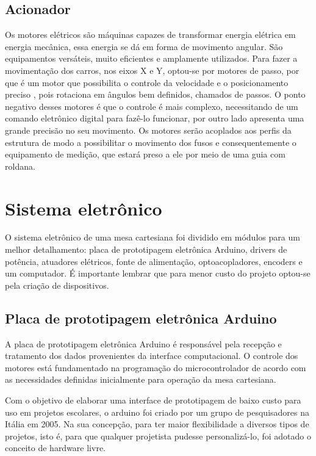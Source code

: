\subsection{Acionador}

Os motores elétricos são máquinas capazes de transformar energia elétrica em energia mecânica, 
essa energia se dá em forma de movimento angular. São equipamentos versáteis, muito eficientes 
e amplamente utilizados. Para fazer a movimentação dos carros, nos eixos X e Y, optou-se por 
motores de passo, por que é um motor que possibilita o controle da velocidade e o posicionamento 
preciso , pois rotaciona em ângulos bem definidos, chamados de passos. O ponto negativo desses 
motores é que o controle é mais complexo, necessitando de um comando eletrônico digital para 
fazê-lo funcionar, por outro lado apresenta uma grande precisão no seu movimento. Os motores 
serão acoplados aos perfis da estrutura de modo a possibilitar o movimento dos fusos e consequentemente 
o equipamento de medição, que estará preso a ele por meio de uma guia com roldana. 

\section{Sistema eletrônico}

O sistema eletrônico de uma mesa cartesiana foi dividido em módulos para um melhor detalhamento: 
placa de prototipagem eletrônica Arduino, drivers de potência, atuadores elétricos, fonte de alimentação, 
optoacopladores, encoders e um computador. É importante lembrar que para menor custo do projeto optou-se 
pela criação de dispositivos.


\subsection{Placa de prototipagem eletrônica Arduino}

A placa de prototipagem eletrônica Arduino é responsável pela recepção e tratamento dos dados provenientes da interface 
computacional. O controle dos motores está fundamentado na programação do microcontrolador de acordo com as necessidades
definidas inicialmente para operação da mesa cartesiana.

Com o objetivo de elaborar uma interface de prototipagem de baixo custo para uso em projetos escolares, o arduino foi 
criado por um grupo de pesquisadores na Itália em 2005. Na sua concepção, para ter maior flexibilidade a diversos tipos 
de projetos, isto é, para que qualquer projetista pudesse personalizá-lo, foi adotado o conceito de hardware livre.

